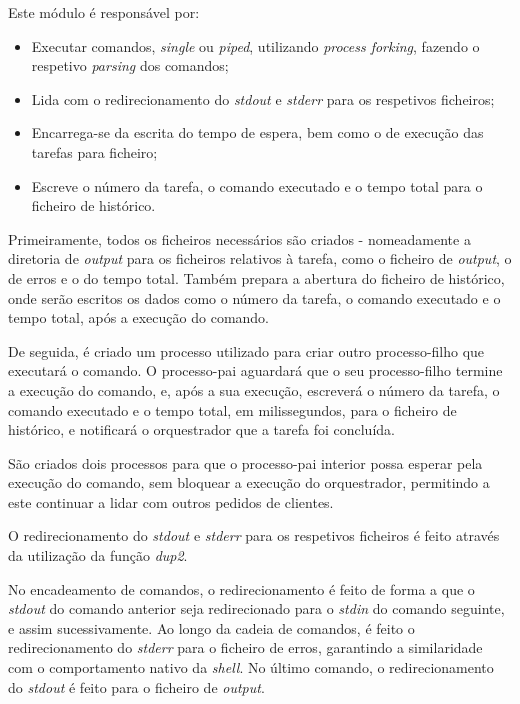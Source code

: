 \documentclass[a4paper,11pt]{scrreprt}
\begin{document}
            Este módulo é responsável por:
            \begin{itemize}
                \item Executar comandos, \textit{single} ou \textit{piped}, utilizando \textit{process forking},
                    fazendo o respetivo \textit{parsing} dos comandos;
                \item Lida com o redirecionamento do \textit{stdout} e \textit{stderr} para os respetivos ficheiros;
                \item Encarrega-se da escrita do tempo de espera, bem como o de execução das tarefas para ficheiro;
                \item Escreve o número da tarefa, o comando executado e o tempo total para o ficheiro de histórico.
            \end{itemize}

            Primeiramente, todos os ficheiros necessários são criados - nomeadamente a diretoria de
            \textit{output} para os ficheiros relativos à tarefa, como o ficheiro de \textit{output},
            o de erros e o do tempo total.
            Também prepara a abertura do ficheiro de histórico, onde serão escritos os dados como o número da tarefa,
            o comando executado e o tempo total, após a execução do comando.

            De seguida, é criado um processo utilizado para criar outro processo-filho que executará o comando.
            O processo-pai aguardará que o seu processo-filho termine a execução do comando, e, após a sua execução,
            escreverá o número da tarefa, o comando executado e o tempo total, em milissegundos, para o ficheiro de histórico,
            e notificará o orquestrador que a tarefa foi concluída.

            São criados dois processos para que o processo-pai interior possa esperar pela execução do comando,
            sem bloquear a execução do orquestrador, permitindo a este continuar a lidar com outros pedidos de clientes.

            O redirecionamento do \textit{stdout} e \textit{stderr} para os respetivos ficheiros é feito
            através da utilização da função \textit{dup2}.

            No encadeamento de comandos, o redirecionamento é feito de forma a que o \textit{stdout} do comando
            anterior seja redirecionado para o \textit{stdin} do comando seguinte, e assim sucessivamente. Ao longo
            da cadeia de comandos, é feito o redirecionamento do \textit{stderr} para o ficheiro de erros, garantindo
            a similaridade com o comportamento nativo da \textit{shell}. No último comando, o redirecionamento do
            \textit{stdout} é feito para o ficheiro de \textit{output}.
\end{document}
